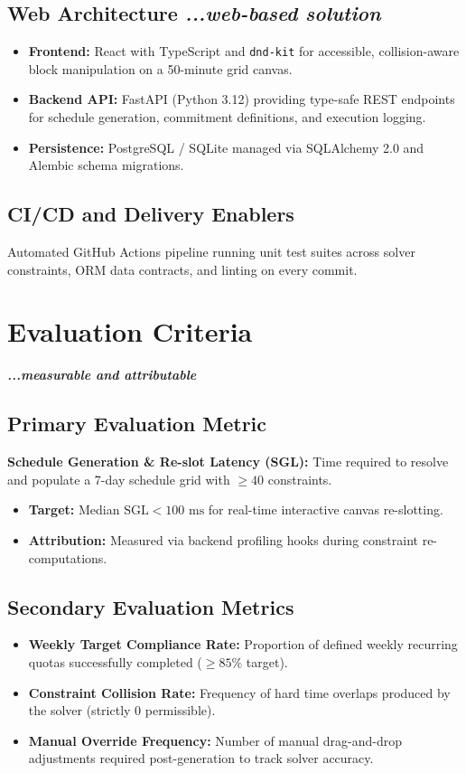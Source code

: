 \documentclass[11pt,a4paper]{article}
\begin{document}
\subsection{Web Architecture \textit{...web-based solution}}
\begin{itemize}
    \item \textbf{Frontend:} React with TypeScript and \texttt{dnd-kit} for accessible, collision-aware block manipulation on a 50-minute grid canvas.
    \item \textbf{Backend API:} FastAPI (Python 3.12) providing type-safe REST endpoints for schedule generation, commitment definitions, and execution logging.
    \item \textbf{Persistence:} PostgreSQL / SQLite managed via SQLAlchemy 2.0 and Alembic schema migrations.
\end{itemize}

\subsection{CI/CD and Delivery Enablers}
Automated GitHub Actions pipeline running unit test suites across solver constraints, ORM data contracts, and linting on every commit.

\section{Evaluation Criteria}
\textbf{\textit{...measurable and attributable}}

\subsection{Primary Evaluation Metric}
\textbf{Schedule Generation \& Re-slot Latency (SGL):} Time required to resolve and populate a 7-day schedule grid with $\ge 40$ constraints.
\begin{itemize}
    \item \textbf{Target:} Median $\text{SGL} < 100\text{ ms}$ for real-time interactive canvas re-slotting.
    \item \textbf{Attribution:} Measured via backend profiling hooks during constraint re-computations.
\end{itemize}

\subsection{Secondary Evaluation Metrics}
\begin{itemize}
    \item \textbf{Weekly Target Compliance Rate:} Proportion of defined weekly recurring quotas successfully completed ($\ge 85\%$ target).
    \item \textbf{Constraint Collision Rate:} Frequency of hard time overlaps produced by the solver (strictly 0 permissible).
    \item \textbf{Manual Override Frequency:} Number of manual drag-and-drop adjustments required post-generation to track solver accuracy.
\end{itemize}
\end{document}

